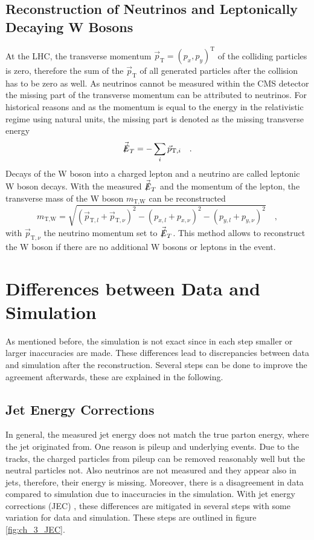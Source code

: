\subsection{Reconstruction of Neutrinos and Leptonically Decaying W Bosons}
At the LHC, the transverse momentum $\vec{p}_\textrm{T} = (p_x, p_y)^\textrm{T}$ of the colliding particles is zero, therefore the sum of the $\vec{p}_\textrm{T}$ of all generated particles after the collision has to be zero as well. As neutrinos cannot be measured within the CMS detector the missing part of the transverse momentum can be attributed to neutrinos. For historical reasons and as the momentum is equal to the energy in the relativistic regime using natural units, the missing part is denoted as the missing transverse energy 
\begin{equation}
\vec{\slashed{E}}_T = - \sum_i \vec{p}_{\textrm{T},i} \quad .
\end{equation}
Decays of the W boson into a charged lepton and a neutrino are called leptonic W boson decays. With the measured $\vec{\slashed{E}}_T$ and the momentum of the lepton, the transverse mass of the W boson $m_{\textrm{T,W}}$ can be reconstructed 
\begin{equation}
m_{\textrm{T,W}} = \sqrt{(\vec{p}_{\textrm{T},l} + \vec{p}_{\textrm{T},\nu})^2 - (p_{x,l} + p_{x,\nu})^2 - (p_{y,l} + p_{y,\nu})^2} \quad ,
\end{equation}
with $\vec{p}_{\textrm{T},\nu}$ the neutrino momentum set to $\vec{\slashed{E}}_T $. This method allows to reconstruct the W boson if there are no additional W bosons or leptons in the event.

\section{Differences between Data and Simulation} \label{sec:ch_3_Reweighting}
As mentioned before, the simulation is not exact since in each step smaller or larger inaccuracies are made. These differences lead to discrepancies between data and simulation after the reconstruction. Several steps can be done to improve the agreement afterwards, these are explained in the following.

\subsection{Jet Energy Corrections}
In general, the measured jet energy does not match the true parton energy, where the jet originated from. One reason is pileup and underlying events. Due to the tracks, the charged particles from pileup can be removed reasonably well but the neutral particles not. Also neutrinos are not measured and they appear also in jets, therefore, their energy is missing. Moreover, there is a disagreement in data compared to simulation due to inaccuracies in the simulation. With jet energy corrections (JEC) \cite{JEC}, these differences are mitigated in several steps with some variation for data and simulation. These steps are outlined in figure \ref{fig:ch_3_JEC}.

